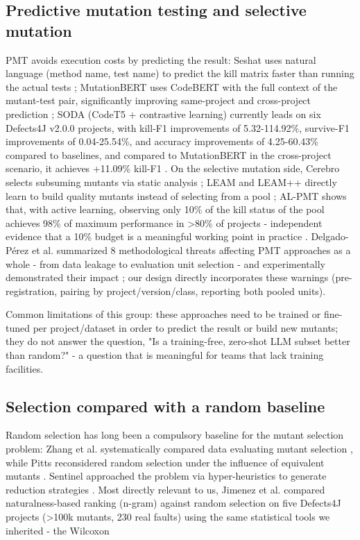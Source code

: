 \subsection{Predictive mutation testing and selective mutation}

PMT avoids execution costs by predicting the result: Seshat uses natural language (method name, test name) to predict the kill matrix faster than running the actual tests \cite{kim2022seshat}; MutationBERT uses CodeBERT with the full context of the mutant-test pair, significantly improving same-project and cross-project prediction \cite{jain2023mutationbert}; SODA (CodeT5 + contrastive learning) currently leads on six Defects4J v2.0.0 projects, with kill-F1 improvements of 5.32-114.92\%, survive-F1 improvements of 0.04-25.54\%, and accuracy improvements of 4.25-60.43\% compared to baselines, and compared to MutationBERT in the cross-project scenario, it achieves +11.09\% kill-F1 \cite{zhao2024soda}. On the selective mutation side, Cerebro selects subsuming mutants via static analysis \cite{garg2023cerebro}; LEAM and LEAM++ directly learn to build quality mutants instead of selecting from a pool \cite{ma2021mudelta}; AL-PMT shows that, with active learning, observing only 10\% of the kill status of the pool achieves 98\% of maximum performance in >80\% of projects - independent evidence that a 10\% budget is a meaningful working point in practice \cite{borsi2025alpmt}. Delgado-Pérez et al. summarized 8 methodological threats affecting PMT approaches as a whole - from data leakage to evaluation unit selection - and experimentally demonstrated their impact \cite{delgadoperez2026pitfalls}; our design directly incorporates these warnings (pre-registration, pairing by project/version/class, reporting both pooled units).

Common limitations of this group: these approaches need to be trained or fine-tuned per project/dataset in order to predict the result or build new mutants; they do not answer the question, "Is a training-free, zero-shot LLM subset better than random?" - a question that is meaningful for teams that lack training facilities.

\subsection{Selection compared with a random baseline}
Random selection has long been a compulsory baseline for the mutant selection problem: Zhang et al. systematically compared data evaluating mutant selection \cite{pitts2022random}, while Pitts reconsidered random selection under the influence of equivalent mutants \cite{pitts2022random}. Sentinel approached the problem via hyper-heuristics to generate reduction strategies \cite{guizzo2022sentinel}. Most directly relevant to us, Jimenez et al. compared naturalness-based ranking (n-gram) against random selection on five Defects4J projects (>100k mutants, 230 real faults) using the same statistical tools we inherited - the Wilcoxon

